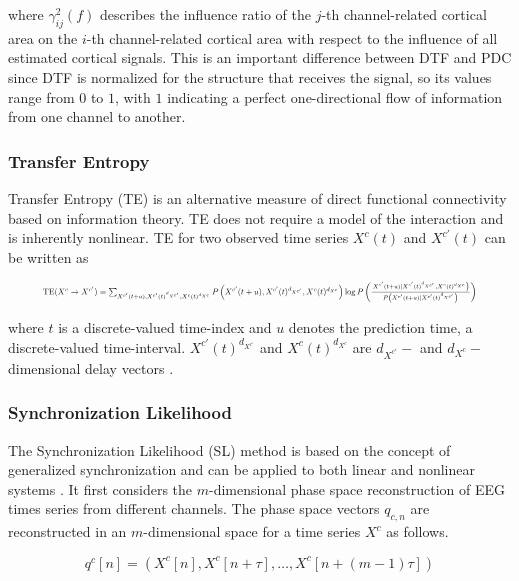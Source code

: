 where $\gamma_{i j}^{2}(f)$ describes the influence ratio of the $j$-th channel-related cortical area on the $i$-th channel-related cortical area with respect to the influence of all estimated cortical signals. This is an important difference between DTF and PDC since DTF is normalized for the structure that receives the signal, so its values range from $0$ to $1$, with $1$ indicating a perfect one-directional flow of information from one channel to another.

\subsubsection{Transfer Entropy}

Transfer Entropy  (TE) is an alternative measure of direct functional connectivity based on information theory. TE does not require a model of the interaction and is inherently nonlinear. TE for two observed time series $X^{c}(t)$ and $X^{c'}(t)$ can be written as

\begin{equation}
\resizebox{0.9\textwidth}{!}{$\operatorname{TE}(X^{c} \rightarrow X^{c'})=\sum_{X^{c'} (t+u), X^{c'}(t)^{d_{X^{c'}}}, X^{c}(t)^{d_{X^{c}}}} P\left(X^{c'}(t+u), X^{c'}(t)^{d_{X^{c'}}}, X^{c}(t)^{d_{X^{c}}}\right) \log P\left(\frac{\left.X^{c'}(t+u) \mid X^{c'}(t)^{d_{X^{c'}}}, X^{c}(t)^{d_{X^{c}}}\right)}{P\left(X^{c'}(t+u) \mid X^{c'}(t)^{d_{X^{c'}}}\right)}\right)$}
\end{equation}

where $t$ is a discrete-valued time-index and $u$ denotes the prediction time, a discrete-valued time-interval. $X^{c'}(t)^{d_{X^{c'}}}$ and $X^{c}(t)^{d_{X^{c}}}$ are $d_{X^{c'}}-$ and $d_{X^{c}}-$ dimensional delay vectors \cite{rezaei2023classification}.

\subsubsection{Synchronization Likelihood}

The Synchronization Likelihood (SL) method is based on the concept of generalized synchronization and can be applied to both linear and nonlinear systems \cite{gonzalez2021network}. It first considers the $m$-dimensional phase space reconstruction of EEG times series from different channels. The phase space vectors $q_{c, n}$ are reconstructed in an $m$-dimensional space for a time series $X^{c}$ as follows.

\begin{equation}
q^{c}[n] = \left(X^{c}[n], X^{c}[n+\tau], \ldots ,X^{c}[n+(m-1)\tau]\right)
\end{equation}

